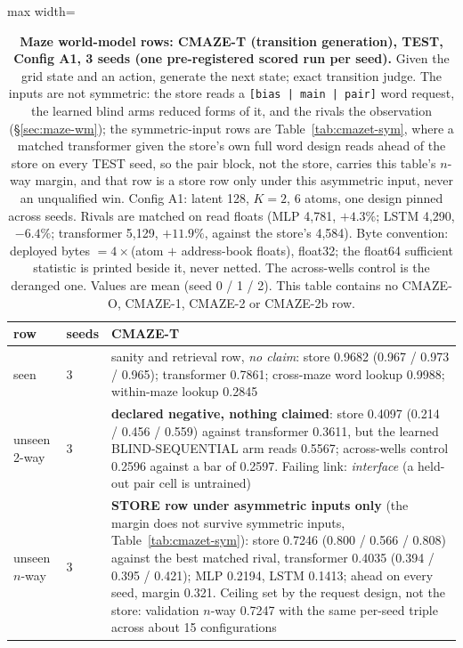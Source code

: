 \documentclass{article} %
\begin{document}
\begin{table}[h]
\centering\scriptsize
\caption{\textbf{Maze world-model rows: CMAZE-T (transition generation), TEST, Config A1, 3 seeds %
(one pre-registered scored run per seed).} Given the grid state and an action, generate the next
state; exact transition judge. The inputs are not symmetric: the store reads a \texttt{[bias | main |
pair]} word request, the learned blind arms reduced forms of it, and the rivals the observation
(\S\ref{sec:maze-wm}); the symmetric-input rows are Table~\ref{tab:cmazet-sym}, where a matched
transformer given the store's own full word design reads ahead of the store on every TEST seed, so the %
pair block, not the store, carries this table's $n$-way margin, and that row is a store row only
under this asymmetric input, never an unqualified win. Config A1: latent 128, $K=2$, 6 atoms, one design pinned across seeds. %
Rivals are matched on read floats (MLP 4,781, $+4.3\%$; LSTM 4,290, $-6.4\%$; transformer 5,129, %
$+11.9\%$, against the store's 4,584). %
Byte convention: deployed bytes $=4\times$(atom $+$
address-book floats), float32; the float64 sufficient statistic is printed beside it, never netted.
The across-wells control is the deranged one. Values are mean (seed 0 / 1 / 2). This table contains
no CMAZE-O, CMAZE-1, CMAZE-2 or CMAZE-2b row.}
\label{tab:cmazet}\label{tab:cmaze-del}
\setlength{\tabcolsep}{2pt}
\begin{adjustbox}{max width=\linewidth}\begin{tabular}{p{1.9cm}p{1.2cm}p{10.0cm}}
\toprule
row & seeds & CMAZE-T \\
\midrule
seen & 3 & sanity and retrieval row, \emph{no claim}: store 0.9682 (0.967 / 0.973 / 0.965); transformer 0.7861; cross-maze word lookup 0.9988; within-maze lookup 0.2845 \\
unseen 2-way & 3 & \textbf{declared negative, nothing claimed}: store 0.4097 (0.214 / 0.456 / 0.559) against transformer 0.3611, but the learned BLIND-SEQUENTIAL arm reads 0.5567; across-wells control 0.2596 against a bar of 0.2597. Failing link: \emph{interface} (a held-out pair cell is untrained) \\
unseen $n$-way & 3 & \textbf{STORE row under asymmetric inputs only} (the margin does not survive symmetric inputs, Table~\ref{tab:cmazet-sym}): store 0.7246 (0.800 / 0.566 / 0.808) against the best matched rival, transformer 0.4035 (0.394 / 0.395 / 0.421); MLP 0.2194, LSTM 0.1413; ahead on every seed, margin 0.321. Ceiling set by the request design, not the store: validation $n$-way 0.7247 with the same per-seed triple across about 15 configurations \\

\end{tabular}
\end{adjustbox}
\end{table}
\end{document}
